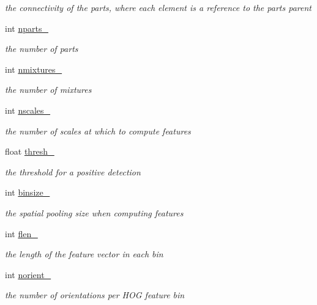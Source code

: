 \begin{DoxyCompactItemize}
\begin{DoxyCompactList}\small\item\em the connectivity of the parts, where each element is a reference to the part\textquotesingle{}s parent \end{DoxyCompactList}\item 
int \hyperlink{classModel_ae8b3d33dbc43d6ab07c1553c9a1bbc2e}{nparts\+\_\+}
\begin{DoxyCompactList}\small\item\em the number of parts \end{DoxyCompactList}\item 
int \hyperlink{classModel_a047a8d7591bde166f0c3ab36a2130b53}{nmixtures\+\_\+}
\begin{DoxyCompactList}\small\item\em the number of mixtures \end{DoxyCompactList}\item 
int \hyperlink{classModel_ab711641b36aa9b8b578acf151af55aa7}{nscales\+\_\+}
\begin{DoxyCompactList}\small\item\em the number of scales at which to compute features \end{DoxyCompactList}\item 
float \hyperlink{classModel_ac2263c14bbd27a5fed433494354e2b02}{thresh\+\_\+}
\begin{DoxyCompactList}\small\item\em the threshold for a positive detection \end{DoxyCompactList}\item 
int \hyperlink{classModel_af34c4284d739cac02812d76eaa231679}{binsize\+\_\+}
\begin{DoxyCompactList}\small\item\em the spatial pooling size when computing features \end{DoxyCompactList}\item 
int \hyperlink{classModel_afafec86aa7175a4664ae76d545f084ea}{flen\+\_\+}
\begin{DoxyCompactList}\small\item\em the length of the feature vector in each bin \end{DoxyCompactList}\item 
int \hyperlink{classModel_a40c5597450f8efb960bb7da74890e73c}{norient\+\_\+}
\begin{DoxyCompactList}\small\item\em the number of orientations per H\+O\+G feature bin \end{DoxyCompactList}\end{DoxyCompactItemize}



